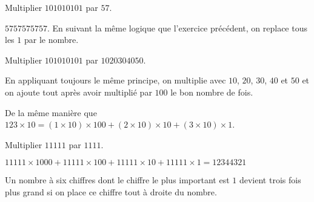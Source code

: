 \documentclass[fleqn,a4paper,nobib]{tufte-handout}
\begin{document}
\begin{exercise}
    Multiplier $101010101$ par $57$.
\end{exercise}

\begin{solution}
    \(5757575757\). En suivant la même logique que l'exercice
    précédent, on replace tous les $1$ par le nombre.
\end{solution}


\begin{exercise}
    Multiplier \(101010101\) par \(1020304050\).

    
    
\end{exercise}

\begin{solution}
    En appliquant toujours le même principe, on multiplie
    avec $10$, \(20\), \(30\), \(40\) et \(50\) et on 
    ajoute tout après avoir multiplié par $100$ le bon nombre
    de fois.

    De la même manière que $123\times10 = (1\times10)\times100 + (2\times10)\times10 + (3\times10)\times1$.

\end{solution}


\begin{exercise}
    Multiplier $11111$ par $1111$.
\end{exercise}

\begin{solution}
    $11111\times1000 + 11111\times100 + 11111\times10
    + 11111\times1
    = 12344321$

\end{solution}


\begin{exercise}
    Un nombre à six chiffres dont le chiffre le plus
    important est $1$ devient trois fois plus grand
    si on place ce chiffre tout à droite du nombre.
\end{exercise}
\end{document}
